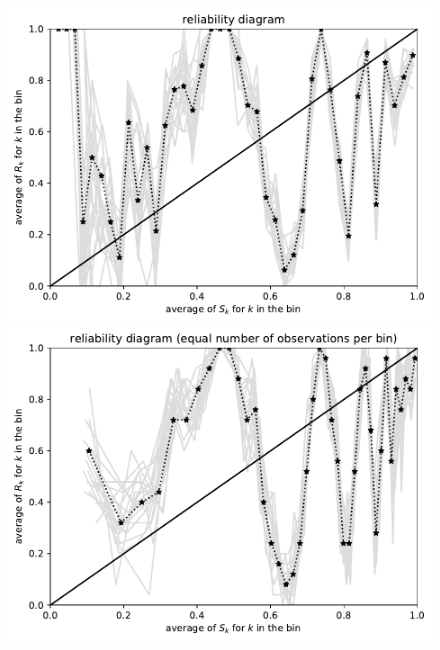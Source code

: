 \documentclass{article}
\begin{document}
\begin{figure}
\begin{centering}
\vspace{\vertsep}

\parbox{\imsize}{\includegraphics[width=\imsize]
                {./codes/unweighted/1000_40_2_1/equiprob.pdf}}
\quad\quad
\parbox{\imsize}{\includegraphics[width=\imsize]
                {./codes/unweighted/1000_40_2_1/equisamp.pdf}}

\vspace{\vertsep}


\end{centering}
\end{figure}
\end{document}
